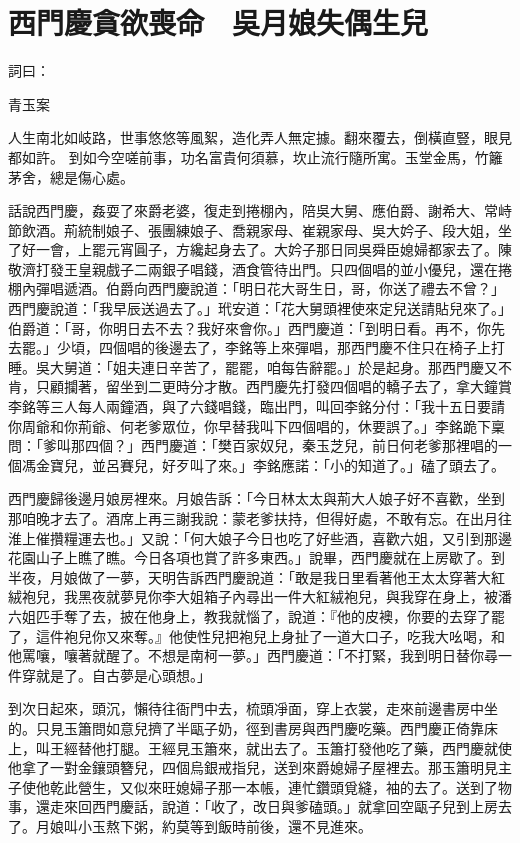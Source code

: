 %

\chapter{西門慶貪欲喪命　吳月娘失偶生兒}

詞曰：

青玉案

人生南北如岐路，世事悠悠等風絮，造化弄人無定據。翻來覆去，倒橫直豎，眼見都如許。
到如今空嗟前事，功名富貴何須慕，坎止流行隨所寓。玉堂金馬，竹籬茅舍，總是傷心處。

話說西門慶，姦耍了來爵老婆，復走到捲棚內，陪吳大舅、應伯爵、謝希大、常峙節飲酒。荊統制娘子、張團練娘子、喬親家母、崔親家母、吳大妗子、段大姐，坐了好一會，上罷元宵圓子，方纔起身去了。大妗子那日同吳舜臣媳婦都家去了。陳敬濟打發王皇親戲子二兩銀子唱錢，酒食管待出門。只四個唱的並小優兒，還在捲棚內彈唱遞酒。伯爵向西門慶說道：「明日花大哥生日，哥，你送了禮去不曾？」西門慶說道：「我早辰送過去了。」玳安道：「花大舅頭裡使來定兒送請貼兒來了。」伯爵道：「哥，你明日去不去？我好來會你。」西門慶道：「到明日看。再不，你先去罷。」少頃，四個唱的後邊去了，李銘等上來彈唱，那西門慶不住只在椅子上打睡。吳大舅道：「姐夫連日辛苦了，罷罷，咱每告辭罷。」於是起身。那西門慶又不肯，只顧攔著，留坐到二更時分才散。西門慶先打發四個唱的轎子去了，拿大鐘賞李銘等三人每人兩鐘酒，與了六錢唱錢，臨出門，叫回李銘分付：「我十五日要請你周爺和你荊爺、何老爹眾位，你早替我叫下四個唱的，休要誤了。」李銘跪下稟問：「爹叫那四個？」西門慶道：「樊百家奴兒，秦玉芝兒，前日何老爹那裡唱的一個馮金寶兒，並呂賽兒，好歹叫了來。」李銘應諾：「小的知道了。」磕了頭去了。

西門慶歸後邊月娘房裡來。月娘告訴：「今日林太太與荊大人娘子好不喜歡，坐到那咱晚才去了。酒席上再三謝我說：蒙老爹扶持，但得好處，不敢有忘。在出月往淮上催攢糧運去也。」又說：「何大娘子今日也吃了好些酒，喜歡六姐，又引到那邊花園山子上瞧了瞧。今日各項也賞了許多東西。」說畢，西門慶就在上房歇了。到半夜，月娘做了一夢，天明告訴西門慶說道：「敢是我日里看著他王太太穿著大紅絨袍兒，我黑夜就夢見你李大姐箱子內尋出一件大紅絨袍兒，與我穿在身上，被潘六姐匹手奪了去，披在他身上，教我就惱了，說道：『他的皮襖，你要的去穿了罷了，這件袍兒你又來奪。』他使性兒把袍兒上身扯了一道大口子，吃我大吆喝，和他罵嚷，嚷著就醒了。不想是南柯一夢。」西門慶道：「不打緊，我到明日替你尋一件穿就是了。自古夢是心頭想。」

到次日起來，頭沉，懶待往衙門中去，梳頭凈面，穿上衣裳，走來前邊書房中坐的。只見玉簫問如意兒擠了半甌子奶，徑到書房與西門慶吃藥。西門慶正倚靠床上，叫王經替他打腿。王經見玉簫來，就出去了。玉簫打發他吃了藥，西門慶就使他拿了一對金鑲頭簪兒，四個烏銀戒指兒，送到來爵媳婦子屋裡去。那玉簫明見主子使他乾此營生，又似來旺媳婦子那一本帳，連忙鑽頭覓縫，袖的去了。送到了物事，還走來回西門慶話，說道：「收了，改日與爹磕頭。」就拿回空甌子兒到上房去了。月娘叫小玉熬下粥，約莫等到飯時前後，還不見進來。

